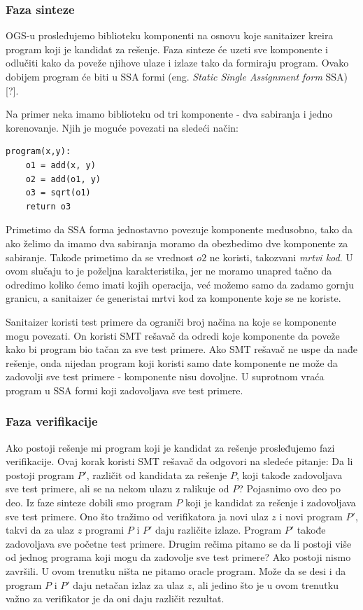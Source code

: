 \subsubsection{Faza sinteze}

OGS-u prosleđujemo biblioteku komponenti na osnovu koje sanitaizer kreira program koji je kandidat za rešenje. Faza sinteze će uzeti sve komponente i odlučiti kako da poveže njihove ulaze i izlaze tako da formiraju program. Ovako dobijem program će biti u SSA formi (eng. \emph{Static Single Assignment form} SSA) [?].

Na primer neka imamo biblioteku od tri komponente - dva sabiranja i jedno korenovanje. Njih je moguće povezati na sledeći način:

\begin{lstlisting}
program(x,y):
	o1 = add(x, y)
	o2 = add(o1, y)
	o3 = sqrt(o1)
	return o3
\end{lstlisting}

Primetimo da SSA forma jednostavno povezuje komponente međusobno, tako da ako želimo da imamo dva sabiranja moramo da obezbedimo dve komponente za sabiranje. Takođe primetimo da se vrednost $o2$ ne koristi, takozvani \emph{mrtvi kod}. U ovom slučaju to je poželjna karakteristika, jer ne moramo unapred tačno da odredimo koliko ćemo imati kojih operacija, već možemo samo da zadamo gornju granicu, a sanitaizer će generistai mrtvi kod za komponente koje se ne koriste.

Sanitaizer koristi test primere da ograniči broj načina na koje se komponente mogu povezati. On koristi SMT rešavač da odredi koje komponente da poveže kako bi program bio tačan za sve test primere. Ako SMT rešavač ne uspe da nađe rešenje, onda nijedan program koji koristi samo date komponente ne može da zadovolji sve test primere - komponente nisu dovoljne. U suprotnom vraća program u SSA formi koji zadovoljava sve test primere.


\subsubsection{Faza verifikacije}

Ako postoji rešenje mi program koji je kandidat za rešenje prosleđujemo fazi verifikacije. Ovaj korak koristi SMT rešavač da odgovori na sledeće pitanje: Da li postoji program $P'$, različit od kandidata za rešenje $P$, koji takođe zadovoljava sve test primere, ali se na nekom ulazu z ralikuje od $P$?
Pojasnimo ovo deo po deo. Iz faze sinteze dobili smo program $P$ koji je kandidat za rešenje i zadovoljava sve test primere. Ono što tražimo od verifikatora ja novi ulaz $z$ i novi program $P'$, takvi da za ulaz $z$ programi $P$ i $P'$ daju različite izlaze. Program $P'$ takođe zadovoljava sve početne test primere.
Drugim rečima pitamo se da li postoji više od jednog programa koji mogu da zadovolje sve test primere? Ako postoji nismo završili.
U ovom trenutku ništa ne pitamo oracle program. Može da se desi i da program $P$ i $P'$ daju netačan izlaz za ulaz $z$, ali jedino što je u ovom trenutku važno za verifikator je da oni daju različit rezultat.

